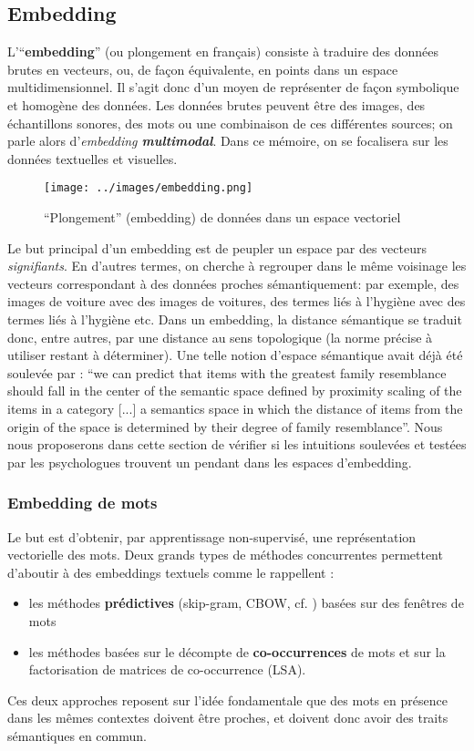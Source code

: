 \documentclass[french]{article}
\begin{document}
		\subsection{Embedding}
			L'``\textbf{embedding}'' (ou plongement en français) consiste à traduire des données brutes en vecteurs, ou, de façon équivalente, en points dans un espace multidimensionnel. Il s'agit donc d'un moyen de représenter de façon symbolique et homogène des données. Les données brutes peuvent être des images, des échantillons sonores, des mots ou une combinaison de ces différentes sources; on parle alors d'\textit{embedding \textbf{multimodal}}. Dans ce mémoire, on se focalisera sur les données textuelles et visuelles.
			\begin{figure}[H]
				\centering
				\texttt{[image: ../images/embedding.png]}
				\caption{``Plongement'' (embedding) de données dans un espace vectoriel}
			\end{figure}
			Le but principal d'un embedding est de peupler un espace par des vecteurs \textit{signifiants}. En d'autres termes, on cherche à regrouper dans le même voisinage les vecteurs correspondant à des données proches sémantiquement: par exemple, des images de voiture avec des images de voitures, des termes liés à l'hygiène avec des termes liés à l'hygiène etc. Dans un embedding, la distance sémantique se traduit donc, entre autres, par une distance au sens topologique (la norme précise à utiliser restant à déterminer). Une telle notion d'espace sémantique avait déjà été soulevée par \cite{rosch1975} : ``we can predict that items with the greatest family resemblance should fall in the center of the semantic space defined by proximity scaling of the items in a category [...] a semantics space in which the distance of items from the origin of the space is determined by their degree of family resemblance''. Nous nous proposerons dans cette section de vérifier si les intuitions soulevées et testées par les psychologues trouvent un pendant dans les espaces d'embedding.
			\subsubsection{Embedding de mots}
			Le but est d'obtenir, par apprentissage non-supervisé, une représentation vectorielle des mots. Deux grands types de méthodes concurrentes permettent d'aboutir à des embeddings textuels comme le rappellent \cite{pennington2014}:
			\begin{itemize}
				\item les méthodes \textbf{prédictives} (skip-gram, CBOW, cf. \cite{mikolov2013}) basées sur des fenêtres de mots
				\item les méthodes basées sur le décompte de \textbf{co-occurrences} de mots et sur la factorisation de matrices de co-occurrence (LSA).
			\end{itemize}
			Ces deux approches reposent sur l'idée fondamentale que des mots en présence dans les mêmes contextes doivent être proches, et doivent donc avoir des traits sémantiques en commun.\\
			
\end{document}
